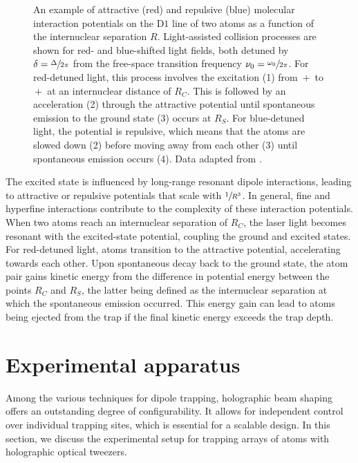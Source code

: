 \documentclass[../Thesis-IJspeert.tex]{subfiles}
\begin{document}
\begin{figure}[h]
\caption[Molecular interaction potentials and light-assisted collision processes for two  atoms]{An example of attractive (red) and repulsive (blue) molecular interaction potentials on the $\mathrm{D}1$ line of two  atoms as a function of the internuclear separation $R$. Light-assisted collision processes are shown for red- and blue-shifted light fields, both detuned by $\delta=\sfrac{\Delta}{2\pi}$ from the free-space transition frequency $\nu_0=\sfrac{\omega_0}{2\pi}$. For red-detuned light, this process involves the excitation (1) from \,+\, to \,+\, at an internuclear distance of $R_C$. This is followed by an acceleration (2) through the attractive potential until spontaneous emission to the ground state (3) occurs at $R_S$. For blue-detuned light, the potential is repulsive, which means that the atoms are slowed down (2) before moving away from each other (3) until spontaneous emission occurs (4). Data adapted from \cite{Pampel_2024}.}
\label{lightassistedcollisions} 
\end{figure}
The excited state is influenced by long-range resonant dipole interactions, leading to attractive or repulsive potentials that scale with $\sfrac{1}{R^3}$. In general, fine and hyperfine interactions contribute to the complexity of these interaction potentials. When two atoms reach an internuclear separation of $R_C$, the laser light becomes resonant with the excited-state potential, coupling the ground and excited states. For red-detuned light, atoms transition to the attractive potential, accelerating towards each other. Upon spontaneous decay back to the ground state, the atom pair gains kinetic energy from the difference in potential energy between the points $R_C$ and $R_S$, the latter being defined as the internuclear separation at which the spontaneous emission occurred. This energy gain can lead to atoms being ejected from the trap if the final kinetic energy exceeds the trap depth. 

\section{Experimental apparatus}
Among the various techniques for dipole trapping, holographic beam shaping offers an outstanding degree of configurability. It allows for independent control over individual trapping sites, which is essential for a scalable design. In this section, we discuss the experimental setup for trapping arrays of  atoms with holographic optical tweezers.
\end{document}
